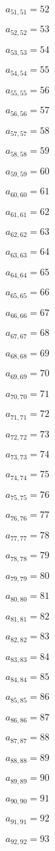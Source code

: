 \documentclass[a4paper,12pt]{article}
\begin{document}
$a _{ 51, 51 } = 52$

$a _{ 52, 52 } = 53$

$a _{ 53, 53 } = 54$

$a _{ 54, 54 } = 55$

$a _{ 55, 55 } = 56$

$a _{ 56, 56 } = 57$

$a _{ 57, 57 } = 58$

$a _{ 58, 58 } = 59$

$a _{ 59, 59 } = 60$

$a _{ 60, 60 } = 61$

$a _{ 61, 61 } = 62$

$a _{ 62, 62 } = 63$

$a _{ 63, 63 } = 64$

$a _{ 64, 64 } = 65$

$a _{ 65, 65 } = 66$

$a _{ 66, 66 } = 67$

$a _{ 67, 67 } = 68$

$a _{ 68, 68 } = 69$

$a _{ 69, 69 } = 70$

$a _{ 70, 70 } = 71$

$a _{ 71, 71 } = 72$

$a _{ 72, 72 } = 73$

$a _{ 73, 73 } = 74$

$a _{ 74, 74 } = 75$

$a _{ 75, 75 } = 76$

$a _{ 76, 76 } = 77$

$a _{ 77, 77 } = 78$

$a _{ 78, 78 } = 79$

$a _{ 79, 79 } = 80$

$a _{ 80, 80 } = 81$

$a _{ 81, 81 } = 82$

$a _{ 82, 82 } = 83$

$a _{ 83, 83 } = 84$

$a _{ 84, 84 } = 85$

$a _{ 85, 85 } = 86$

$a _{ 86, 86 } = 87$

$a _{ 87, 87 } = 88$

$a _{ 88, 88 } = 89$

$a _{ 89, 89 } = 90$

$a _{ 90, 90 } = 91$

$a _{ 91, 91 } = 92$

$a _{ 92, 92 } = 93$
\end{document}
